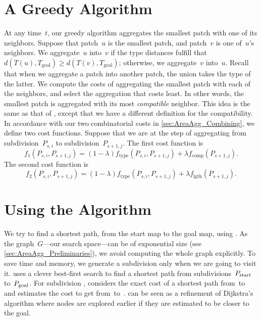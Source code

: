 \documentclass[acmsmall,natbib=false]{acmart}
\begin{document}
\section{A Greedy Algorithm}
\label{sec:AreaAgg_Greedy}
At any time~$t$,
our greedy algorithm aggregates the smallest patch
with one of its neighbors.
Suppose that patch~$u$ is the smallest patch,
and patch~$v$ is one of~$u$'s neighbors.
We aggregate~$u$ into~$v$ 
if the type distances fulfill that
$d\left(T(u), T_\mathrm{goal}\right) 
\ge d\left(T(v), T_\mathrm{goal}\right)$;
otherwise, we aggregate~$v$ into~$u$.
Recall that when we aggregate a patch into another patch,
the union takes the type of the latter.
We compute the costs of aggregating the smallest patch 
with each of the neighbors, 
and select the aggregation that costs least.
In other words, the smallest patch is aggregated with 
its most \emph{compatible} neighbor.
This idea is the same as that of \textcite{vanOosterom2005},
except that we have a different definition 
for the compatibility.
In accordance with our two combinatorial costs in 
\sect\ref{sec:AreaAgg_Combining},
we define two cost functions.
Suppose that we are at the step of aggregating 
from subdivision~$P_{s,i}$ to subdivision~$P_{s+1,j}$.
The first cost function is 
\begin{equation}
\label{eq:f_1}
f_1(P_{s,i},P_{s+1,j})=
(1-\lambda)f_\mathrm{type}(P_{s,i},P_{s+1,j})
+\lambda f_{\mathrm{comp}}(P_{s+1,j}). \nonumber
\end{equation}
The second cost function is
\begin{equation}
\label{eq:f_2}
f_2(P_{s,i},P_{s+1,j})=
(1-\lambda)f_\mathrm{type}(P_{s,i},P_{s+1,j})
+\lambda f_{\mathrm{lgth}}(P_{s+1,j}). \nonumber
\end{equation}



\section{Using the \Astar Algorithm}
\label{sec:AreaAgg_AStar}

We try to find a shortest path,
from the start map to the goal map,
using \Astar \parencite{Hart1968,PatelAStar}.  
As the graph~$G$---our search space---can 
be of exponential size 
(see \sect\ref{sec:AreaAgg_Preliminaries}), 
we avoid computing the whole graph explicitly.
To save time and memory, 
we generate a subdivision \Pnode only 
when we are going to visit it.
\Astar uses a clever best-first search 
to find a shortest path 
from subdivisions~$P_\mathrm{start}$ to~$P_\mathrm{goal}$.  
For subdivision \Pnode,
\Astar considers the exact cost of a shortest path 
from~\Pstart to~\Pnode 
and estimates the cost to get from~\Pnode to~\Pgoal.  
\Astar can be seen as a refinement of Dijkstra's algorithm
where nodes are explored earlier 
if they are estimated to be closer to the goal.
\end{document}

